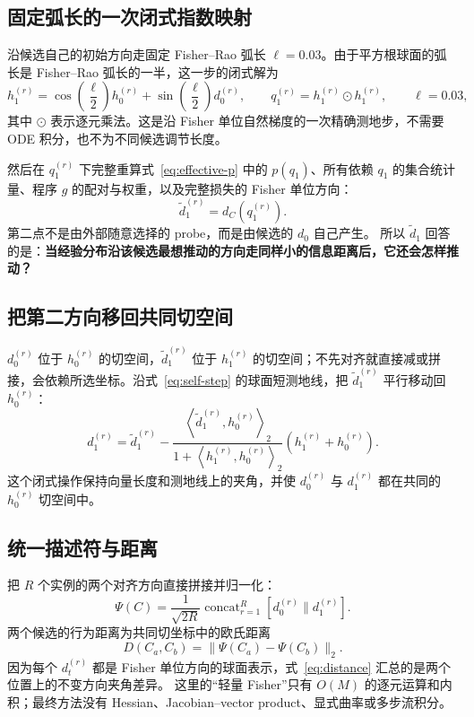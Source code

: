 \documentclass[UTF8,11pt]{ctexart}
\newcommand{\concat}{\mathbin{\|}}
\begin{document}
\subsection{固定弧长的一次闭式指数映射}

沿候选自己的初始方向走固定 Fisher--Rao 弧长 $\ell=0.03$。由于平方根球面的弧长是 Fisher--Rao 弧长的一半，这一步的闭式解为
\begin{equation}
h_1^{(r)}=
\cos\!\left(\frac{\ell}{2}\right)h_0^{(r)}
+\sin\!\left(\frac{\ell}{2}\right)d_0^{(r)},
\qquad
q_1^{(r)}=h_1^{(r)}\odot h_1^{(r)},
\qquad \ell=0.03,
\label{eq:self-step}
\end{equation}
其中 $\odot$ 表示逐元乘法。这是沿 Fisher 单位自然梯度的一次精确测地步，不需要 ODE 积分，也不为不同候选调节长度。

然后在 $q_1^{(r)}$ 下完整重算式~\eqref{eq:effective-p} 中的 $p(q_1)$、所有依赖 $q_1$ 的集合统计量、程序 $g$ 的配对与权重，以及完整损失的 Fisher 单位方向：
\[
\widetilde d_1^{(r)}=d_C(q_1^{(r)}).
\]
第二点不是由外部随意选择的 probe，而是由候选的 $d_0$ 自己产生。
所以 $\widetilde d_1$ 回答的是：\textbf{当经验分布沿该候选最想推动的方向走同样小的信息距离后，它还会怎样推动？}

\subsection{把第二方向移回共同切空间}

$d_0^{(r)}$ 位于 $h_0^{(r)}$ 的切空间，$\widetilde d_1^{(r)}$ 位于 $h_1^{(r)}$ 的切空间；不先对齐就直接减或拼接，会依赖所选坐标。沿式~\eqref{eq:self-step} 的球面短测地线，把 $\widetilde d_1^{(r)}$ 平行移动回 $h_0^{(r)}$：
\begin{equation}
d_1^{(r)}=
\widetilde d_1^{(r)}-
\frac{\left\langle\widetilde d_1^{(r)},h_0^{(r)}\right\rangle_2}
{1+\left\langle h_1^{(r)},h_0^{(r)}\right\rangle_2}
\left(h_1^{(r)}+h_0^{(r)}\right).
\label{eq:transport}
\end{equation}
这个闭式操作保持向量长度和测地线上的夹角，并使 $d_0^{(r)}$ 与 $d_1^{(r)}$ 都在共同的 $h_0^{(r)}$ 切空间中。

\subsection{统一描述符与距离}

把 $R$ 个实例的两个对齐方向直接拼接并归一化：
\begin{equation}
\Psi(C)=\frac{1}{\sqrt{2R}}
\operatorname{concat}_{r=1}^{R}
\left[d_0^{(r)}\concat d_1^{(r)}\right].
\label{eq:descriptor}
\end{equation}
两个候选的行为距离为共同切坐标中的欧氏距离
\begin{equation}
D(C_a,C_b)=\lVert\Psi(C_a)-\Psi(C_b)\rVert_2.
\label{eq:distance}
\end{equation}
因为每个 $d_t^{(r)}$ 都是 Fisher 单位方向的球面表示，式~\eqref{eq:distance} 汇总的是两个位置上的不变方向夹角差异。
这里的“轻量 Fisher”只有 $O(M)$ 的逐元运算和内积；最终方法没有 Hessian、Jacobian--vector product、显式曲率或多步流积分。
\end{document}
